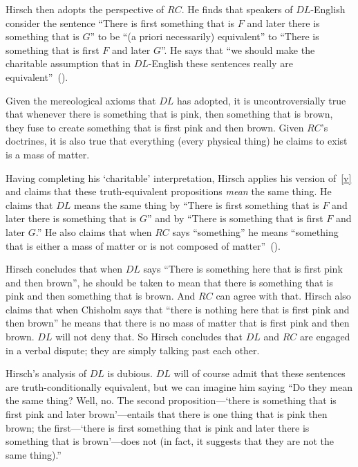 \documentclass[11pt]{article}
\begin{document}
\begin{spacing}{1.25}
Hirsch then adopts the perspective of $RC$.  He finds that speakers of
$DL$-English consider the sentence ``There is first something that is
$F$ and later there is something that is $G$'' to be ``(a priori
necessarily) equivalent'' to ``There is something that is first $F$
and later $G$''.  He says that ``we should make the charitable
assumption that in $DL$-English these sentences really are
equivalent''~(\citeyear[78]{hirsch2005}).

Given the mereological axioms that $DL$ has adopted, it is
uncontroversially true that whenever there is something that is pink,
then something that is brown, they fuse to create something that is
first pink and then brown.  Given $RC$'s doctrines, it is also
true that everything (every physical thing) he claims to exist is a
mass of matter.

Having completing his `charitable' interpretation, Hirsch applies his
version of~\ref{v} and claims that these truth-equivalent propositions
{\em mean} the same thing.  He claims that $DL$ means the same thing
by ``There is first something that is $F$ and later there is something
that is $G$'' and by ``There is something that is first $F$ and later
$G$.''  He also claims that when $RC$ says ``something'' he means
``something that is either a mass of matter or is not composed of
matter''~(\citeyear[76]{hirsch2005}).

Hirsch concludes that when $DL$ says ``There is something here that is
first pink and then brown'', he should be taken to mean that there is
something that is pink and then something that is brown.  And $RC$ can
agree with that.  Hirsch also claims that when Chisholm says that
``there is nothing here that is first pink and then brown'' he means
that there is no mass of matter that is first pink and then
brown.  $DL$ will not deny that.  So Hirsch concludes that $DL$ and
$RC$ are engaged in a verbal dispute; they are simply talking past
each other.

Hirsch's analysis of $DL$ is dubious.  $DL$ will of course admit that
these sentences are truth-conditionally equivalent, but we can imagine
him saying ``Do they mean the same thing?  Well, no.  The second
proposition---`there is something that is first pink and later
brown'---entails that there is one thing that is pink then brown; the
first---`there is first something that is pink and later there is
something that is brown'---does not (in fact, it suggests that they
are not the same thing).''


\end{spacing}
\end{document}
